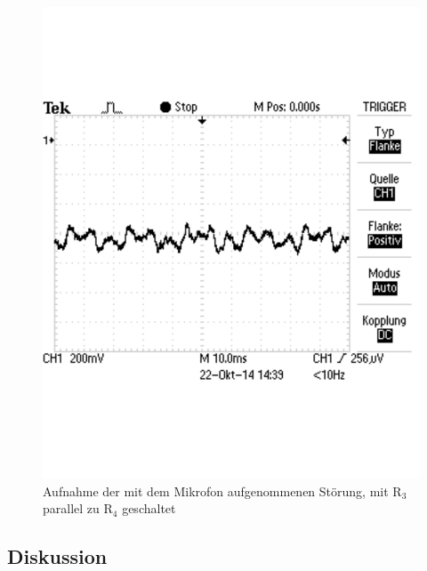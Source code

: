 \documentclass[12pt,a4paper]{article}
\begin{document}
\begin{figure}[H] 
  \centering
    \includegraphics[scale = 0.4]{2_3_r3p_st.pdf}
  	\caption[Aufnahme der mit dem Mikrofon aufgenommenen Störung, mit R$_3$ parallel zu R$_4$ geschaltet]{Aufnahme der mit dem Mikrofon aufgenommenen Störung, mit R$_3$ parallel zu R$_4$ geschaltet}
  \label{fig:2_3_r3p_st}
\end{figure}

\subsection{Diskussion}
\end{document}
